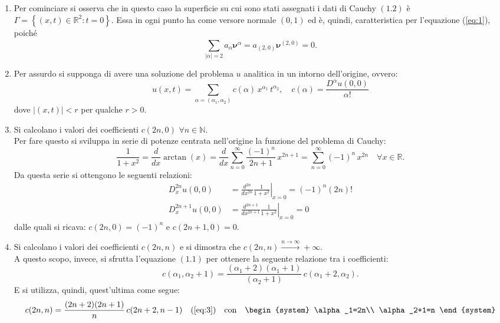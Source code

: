 \begin{example}
\begin{enumerate}
\item
Per cominciare si osserva che in questo caso la superficie su cui sono stati assegnati i dati di Cauchy $(1.2)$ è 
$\Gamma=\left\lbrace(x,t) \in \mathbb{R}^2:t=0\right\rbrace$. Essa in ogni punto ha come versore normale $(0,1)$ ed è, quindi,
caratteristica per l'equazione (\ref{eq:1}), poiché
$$\sum_{|\alpha|=2}^{\;} a_\alpha \boldsymbol{\nu}^\alpha = a_{(2,0)}\boldsymbol{\nu}^{(2,0)} = 0.$$
\item
Per assurdo si supponga di avere una soluzione del problema $u$ analitica in un intorno dell'origine, ovvero:
$$u(x,t) = \sum_{\alpha = (\alpha_1, \alpha_2) }^{\;} c(\alpha) \, x^{\alpha_1} \, t ^{\alpha_2}, \quad
 c(\alpha) = \frac{D^\alpha u(0,0)}{\alpha!}$$
dove $|(x,t)|<r$ per qualche $r>0$.
\item
Si calcolano i valori dei coefficienti $c(2n,0)$ $\forall n \in \mathbb{N}$.\\
Per fare questo si sviluppa in serie di potenze centrata nell'origine la funzione del problema di Cauchy:
$$\frac{1}{1+x^2} = \frac{d}{dx}\arctan(x) = \frac{d}{dx}\sum_{n=0}^{\infty}\frac{(-1)^n}{2n+1} \, x^{2n+1} 
= \sum_{n=0}^{\infty}(-1)^n \, x^{2n} \quad \forall x \in \mathbb{R}.$$
Da questa serie si ottengono le seguenti relazioni:
\begin{align*}
D_x^{2n}u(0,0) &= \frac{d^{2n}}{dx^{2n}} \left. \frac{1}{1+x^2}\right|_{x=0} = (-1)^n (2n)!\\
D_x^{2n+1}u(0,0) &= \frac{d^{2n+1}}{dx^{2n+1}} \left. \frac{1}{1+x^2} \right|_{x=0} = 0
\end{align*} 
dalle quali si ricava: $c(2n,0)=(-1)^n$ e $c(2n+1,0)=0$.
\item
Si calcolano i valori dei coefficienti $c(2n,n)$ e si dimostra che  $c(2n,n) \xrightarrow{n\rightarrow\infty} +\infty$.\\
A questo scopo, invece, si sfrutta l'equazione $(1.1)$ per ottenere la seguente relazione tra i coefficienti:
\begin{equation} 
\label{eq:3}
c(\alpha_1,\alpha_2+1) = \frac{(\alpha_1+2)(\alpha_1+1)}{(\alpha_2+1)} \, c(\alpha_1+2,\alpha_2).
\end{equation}
E si utilizza, quindi, quest'ultima come segue:
\begin{align*}
c(2n,n) &= \frac{(2n+2)(2n+1)}{n} \, c(2n+2,n-1)   &(\ref{eq:3})\quad\text{con} \quad 
\begin{system}
\alpha_1=2n\\
\alpha_2+1=n
\end{system}\\

\end{align*}
\end{enumerate}
\end{example}
